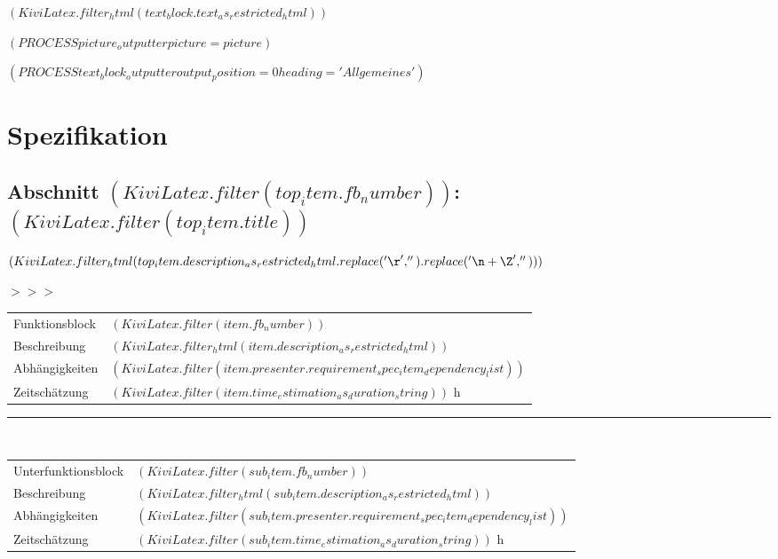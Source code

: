 \documentclass{scrartcl}
\begin{document}
$( KiviLatex.filter_html(text_block.text_as_restricted_html) )$

$( PROCESS picture_outputter picture=picture )$


$( PROCESS text_block_outputter output_position=0 heading='Allgemeines' )$

\newpage

\section{Spezifikation}

\setlength{\LTpre}{-0.3cm}



\subsection{Abschnitt $( KiviLatex.filter(top_item.fb_number) )$: $( KiviLatex.filter(top_item.title) )$}

$( KiviLatex.filter_html(top_item.description_as_restricted_html.replace('\r', '').replace('\n+\Z', '')) )$

\vspace{0.5cm}
\parbox[t]{1.0cm}{\textcolor{kivitendodarkred}{$>>>$}}%
\parbox[t]{15.0cm}{%
  \begin{longtable}{p{2.8cm}p{11.7cm}}
    Funktionsblock & $( KiviLatex.filter(item.fb_number) )$                                      \\
    Beschreibung   & $( KiviLatex.filter_html(item.description_as_restricted_html) )$             \\
    Abhängigkeiten & $( KiviLatex.filter(item.presenter.requirement_spec_item_dependency_list) )$ \\
    Zeitschätzung  & $( KiviLatex.filter(item.time_estimation_as_duration_string) )$ h
\end{longtable}}

\hspace*{1.15cm}\rule{15.2cm}{0.2pt}\\
\hspace*{1.0cm}%
\parbox[t]{15.0cm}{%
  \begin{longtable}{p{2.8cm}p{11.7cm}}
    Unterfunktionsblock & $( KiviLatex.filter(sub_item.fb_number) )$                                      \\
    Beschreibung        & $( KiviLatex.filter_html(sub_item.description_as_restricted_html) )$             \\
    Abhängigkeiten      & $( KiviLatex.filter(sub_item.presenter.requirement_spec_item_dependency_list) )$ \\
    Zeitschätzung       & $( KiviLatex.filter(sub_item.time_estimation_as_duration_string) )$ h
\end{longtable}}
\end{document}

